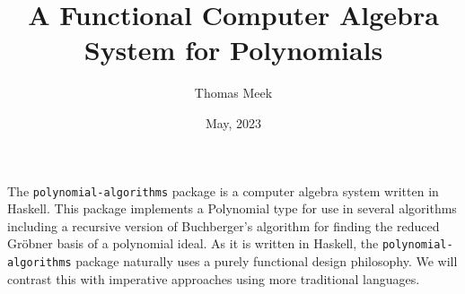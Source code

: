 \documentclass[MS, xcolor=dvipsnames]{wfuthesis}
\theoremstyle{definition}
\begin{document}
\title{A Functional Computer Algebra System for Polynomials}
\author{Thomas Meek}


\date{May, 2023}

\maketitle

\clearpage

\acknowledgments 

\lipsum[1]

\tableofcontents

\abstract

The \lstinline{polynomial-algorithms} package is a computer algebra system written in Haskell. This package implements a Polynomial type for use in several algorithms including a recursive version of Buchberger's algorithm for finding the reduced Gr\"obner basis of a polynomial ideal. As it is written in Haskell, the \lstinline{polynomial-algorithms} package naturally uses a purely functional design philosophy. We will contrast this with imperative approaches using more traditional languages. 

\chapters
\end{document}
